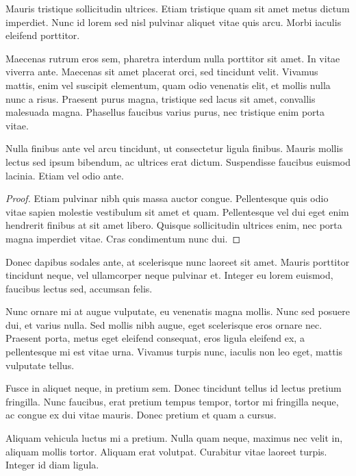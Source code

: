 \begin{definition}
Mauris tristique sollicitudin ultrices. Etiam tristique quam sit amet metus dictum imperdiet. Nunc id lorem sed nisl pulvinar aliquet vitae quis arcu. Morbi iaculis eleifend porttitor.
\end{definition}

Maecenas rutrum eros sem, pharetra interdum nulla porttitor sit amet. In vitae viverra ante. Maecenas sit amet placerat orci, sed tincidunt velit. Vivamus mattis, enim vel suscipit elementum, quam odio venenatis elit, et mollis nulla nunc a risus. Praesent purus magna, tristique sed lacus sit amet, convallis malesuada magna. Phasellus faucibus varius purus, nec tristique enim porta vitae.

\begin{theorem}
Nulla finibus ante vel arcu tincidunt, ut consectetur ligula finibus. Mauris mollis lectus sed ipsum bibendum, ac ultrices erat dictum. Suspendisse faucibus euismod lacinia. Etiam vel odio ante.
\end{theorem}
\begin{proof}
Etiam pulvinar nibh quis massa auctor congue. Pellentesque quis odio vitae sapien molestie vestibulum sit amet et quam. Pellentesque vel dui eget enim hendrerit finibus at sit amet libero. Quisque sollicitudin ultrices enim, nec porta magna imperdiet vitae. Cras condimentum nunc dui.
\end{proof}

Donec dapibus sodales ante, at scelerisque nunc laoreet sit amet. Mauris porttitor tincidunt neque, vel ullamcorper neque pulvinar et. Integer eu lorem euismod, faucibus lectus sed, accumsan felis. 

\begin{remark}
Nunc ornare mi at augue vulputate, eu venenatis magna mollis. Nunc sed posuere dui, et varius nulla. Sed mollis nibh augue, eget scelerisque eros ornare nec. Praesent porta, metus eget eleifend consequat, eros ligula eleifend ex, a pellentesque mi est vitae urna. Vivamus turpis nunc, iaculis non leo eget, mattis vulputate tellus.
\end{remark}

Fusce in aliquet neque, in pretium sem. Donec tincidunt tellus id lectus pretium fringilla. Nunc faucibus, erat pretium tempus tempor, tortor mi fringilla neque, ac congue ex dui vitae mauris. Donec pretium et quam a cursus.

\begin{note}
Aliquam vehicula luctus mi a pretium. Nulla quam neque, maximus nec velit in, aliquam mollis tortor. Aliquam erat volutpat. Curabitur vitae laoreet turpis. Integer id diam ligula.
\end{note}

